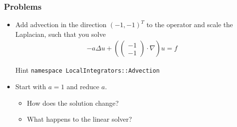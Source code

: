 \begin{frame}
  \frametitle{Problems}
  \begin{itemize}
  \item Add advection in the direction $(-1,-1)^T$ to the operator and
    scale the Laplacian, such that you solve
    \begin{gather*}
      -a\Delta u + \left(
      \begin{pmatrix}
        -1\\-1
      \end{pmatrix}
      \cdot \nabla\right) u = f
    \end{gather*}
    \begin{block}{Hint}
      \lstinline!namespace LocalIntegrators::Advection!      
    \end{block}
  \item Start with $a=1$ and reduce $a$.
    \begin{itemize}
    \item How does the solution change?
    \item What happens to the linear solver?
    \end{itemize}
  \end{itemize}
\end{frame}
